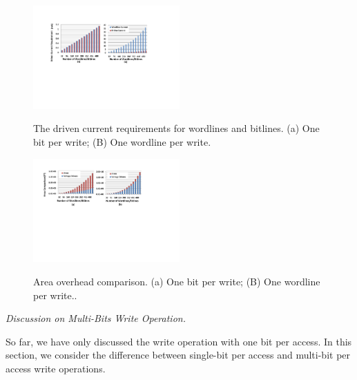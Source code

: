 \begin{figure}%
\centering
  \includegraphics[width=0.5\textwidth]{./figures/drive_i_f.pdf}\\
  \caption{The driven current requirements for wordlines and bitlines. (a) One bit per write; (B) One wordline per write.}\label{fig:drive_i}
\end{figure}



\begin{figure}%
\centering
  \includegraphics[width=0.5\textwidth]{./figures/area_comp_f.pdf}\\
  \caption{Area overhead comparison. (a) One bit per write; (B) One wordline per write..}\label{fig:area_i}
\vspace{-10pt}
\end{figure}

\vspace{6pt} \emph{Discussion on Multi-Bits Write Operation.} \vspace{6pt}

So far, we have only discussed the write operation with one bit per
access. In this section, we consider the difference between single-bit per
access and multi-bit per access write operations.

